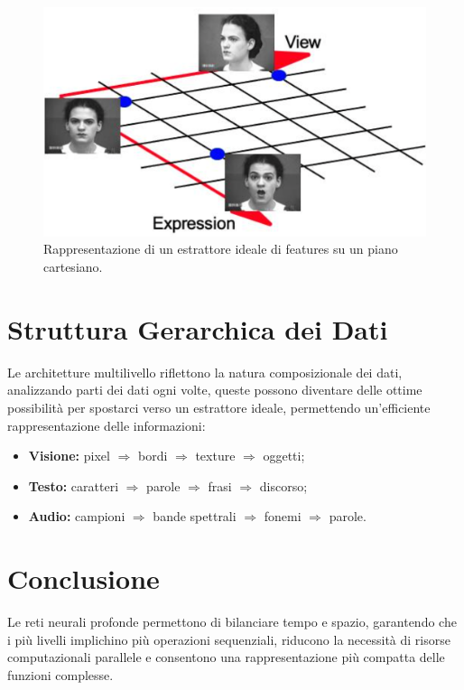 \begin{figure}
    \centering
    \includegraphics[width=0.45\linewidth]{figure/cartesianFig.png}
    \caption{Rappresentazione di un estrattore ideale di features su un piano cartesiano.}
    \label{fig:cartesianFig}
\end{figure}
\section{Struttura Gerarchica dei Dati}
Le architetture multilivello riflettono la natura composizionale dei dati, analizzando parti dei dati ogni volte, queste possono diventare delle ottime possibilità per spostarci verso un estrattore ideale, permettendo un'efficiente rappresentazione delle informazioni:

\begin{itemize}
    \item \textbf{Visione:} pixel $\Rightarrow$ bordi $\Rightarrow$ texture $\Rightarrow$ oggetti;
    \item \textbf{Testo:} caratteri $\Rightarrow$ parole $\Rightarrow$ frasi $\Rightarrow$ discorso;
    \item \textbf{Audio:} campioni $\Rightarrow$ bande spettrali $\Rightarrow$ fonemi $\Rightarrow$ parole.
\end{itemize}

\section{Conclusione}
Le reti neurali profonde permettono di bilanciare tempo e spazio, garantendo che i più livelli implichino più operazioni sequenziali, riducono la necessità di risorse computazionali parallele e consentono una rappresentazione più compatta delle funzioni complesse.